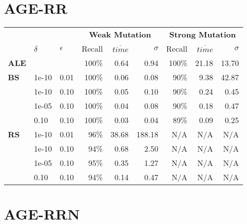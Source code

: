 \section{AGE-RR}

\begin{small} 
\begin{tabular}{lll|r|r|r|r|r|r} 
 & & & \multicolumn{3}{c|}{\textbf{Weak Mutation}} & \multicolumn{3}{c}{\textbf{Strong Mutation}}\\ 
 & $\delta$ & $\epsilon$ & Recall & $\overline{time}$ & $\sigma$ & Recall & $\overline{time}$ & $\sigma$ \\  
\hline 
\textbf{ALE} & & & 100\% & 0.64  & 0.94  & 100\% & 21.18  & 13.70  \\ 
\textbf{BS}  & 1e-10  & 0.01  & 100\% & 0.06  & 0.08  & 90\% & 9.38  & 42.87\\
 & 1e-10  & 0.10  & 100\% & 0.05  & 0.10  & 90\% & 0.24  & 0.45\\
 & 1e-05  & 0.10  & 100\% & 0.04  & 0.08  & 90\% & 0.18  & 0.47\\
 & 0.10  & 0.10  & 100\% & 0.03  & 0.04  & 89\% & 0.09  & 0.25\\
\textbf{RS}  & 1e-10  & 0.01  & 96\% & 38.68  & 188.18 & N/A & N/A & N/A \\
 & 1e-10  & 0.10  & 94\% & 0.68  & 2.50 & N/A & N/A & N/A \\
 & 1e-05  & 0.10  & 95\% & 0.35  & 1.27 & N/A & N/A & N/A \\
 & 0.10  & 0.10  & 94\% & 0.14  & 0.47 & N/A & N/A & N/A \\
\end{tabular} 
\end{small} 


\section{AGE-RRN}

